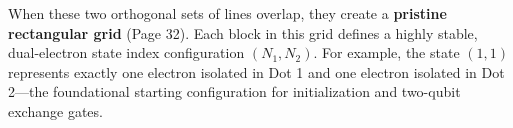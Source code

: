 \documentclass[
]{article}
\begin{document}
When these two orthogonal sets of lines overlap, they create a
\textbf{pristine rectangular grid} (Page 32). Each block in this grid
defines a highly stable, dual-electron state index configuration
\((N_1, N_2)\). For example, the state \((1,1)\) represents exactly one
electron isolated in Dot 1 and one electron isolated in Dot 2---the
foundational starting configuration for initialization and two-qubit
exchange gates.
\end{document}
